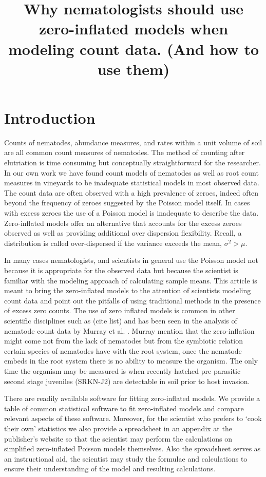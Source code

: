 \documentclass{article}
\begin{document}
\title{
Why nematologists should use zero-inflated models when modeling count data. (And how to use them)
}

\maketitle

\section{Introduction}
Counts of nematodes, abundance measures, and rates within a unit volume of soil are all common count measures of nematodes. The method of counting after elutriation is time consuming but conceptually straightforward for the researcher. In our own work \cite{} we have found count models of nematodes as well as root count measures in vineyards to be inadequate statistical models in most observed data. The count data are often observed with a high prevalence of zeroes, indeed often beyond the frequency of zeroes suggested by the Poisson model itself. In cases with excess zeroes the use of a Poisson model is inadequate to describe the data. Zero-inflated models offer an alternative that accounts for the excess zeroes observed as well as providing additional over dispersion flexibility. Recall, a distribution is called over-dispersed if the variance exceeds the mean, $\sigma^2 > \mu$. 

In many cases nematologists, and scientists in general use the Poisson model not because it is appropriate for the observed data but because the scientist is familiar with the modeling approach of calculating sample means. This article is meant to bring the zero-inflated models to the attention of scientists modeling count data and point out the pitfalls of using traditional methods in the presence of excess zero counts. The use of zero inflated models is common in other scientific disciplines such as (cite list\cite{}) and has been seen in the analysis of nematode count data by Murray et al. \cite{murray2011modeling}. Murray mention that the zero-inflation might come not from the lack of nematodes but from the symbiotic relation certain species of nematodes have with the root system, once the nematode embeds in the root system there is no ability to measure the organism. The only time the organism may be measured is when recently-hatched pre-parasitic second stage juveniles (SRKN-J2) are detectable in soil prior to host invasion.

There are readily available software for fitting zero-inflated models. We provide a table of common statistical software to fit zero-inflated models and compare relevant aspects of these software. Moreover, for the scientist who prefers to `cook their own' statistics we also provide a spreadsheet in an appendix at the publisher's website so that the scientist may perform the calculations on simplified zero-inflated Poisson models themselves. Also the spreadsheet serves as an instructional aid, the scientist may study the formulae and calculations to ensure their understanding of the model and resulting calculations.  
\end{document}
